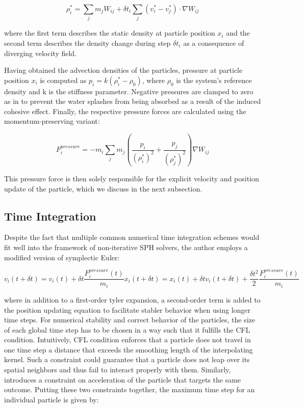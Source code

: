 \documentclass[
	11pt, 
	DIV10,
	ngerman,
	a4paper, 
	oneside, 
	headings=normal, 
	captions=tableheading,
	final, 
	numbers=noenddot
]{scrartcl}
\begin{document}
\begin{equation}
	\label{eq4}
	\rho_{i}^{*} = \sum_{j}m_{j}W_{ij} + \delta t_{i}\sum_{j}(v_{i}^{*} - v_{j}^{*})\cdot \nabla W_{ij}
\end{equation}

where the first term describes the static density at particle position $ x_{i} $ and the second term describes the density change during step $ \delta t_{i} $ as a consequence of diverging velocity field.
\par
Having obtained the advection densities of the particles, pressure at particle position $ x_{i} $ is computed as $ p_{i} = k(\rho_{i}^{*} - \rho_{0}) $, where $ \rho_{0} $ is the system's reference density and k is the stiffness parameter. Negative pressures are clamped to zero as in \cite{ihmsen2013implicit} to prevent the water splashes from being absorbed as a result of the induced cohesive effect. Finally, the respective pressure forces are calculated using the momentum-preserving variant:

\begin{equation}
	\label{eq5}
	F_{i}^{pressure} = -m_{i}\sum_{j}m_{j}(\frac{p_{i}}{(\rho_{i}^{*})^{2}} + \frac{p_{j}}{(\rho_{j}^{*})^{2}})\nabla W_{ij}
\end{equation}

This pressure force is then solely responsible for the explicit velocity and position update of the particle, which we discuss in the next subsection.

\subsection{Time Integration}

Despite the fact that multiple common numerical time integration schemes would fit well into the framework of non-iterative SPH solvers, the author employs a modified version of symplectic Euler:

\begin{equation}
	\label{eq6}
	v_{i}(t + \delta t) = v_{i}(t) + \delta	t\frac{F_{i}^{pressure}(t)}{m_{i}}
	x_{i}(t + \delta t) = x_{i}(t) + \delta t v_{i}(t + \delta t) + \frac{\delta t^{2}}{2}\frac{F_{i}^{pressure}(t)}{m_{i}}
\end{equation}

where in addition to a first-order tyler expansion, a second-order term is added to the position updating equation to facilitate stabler behavior when using longer time steps. For numerical stability and correct behavior of the particles, the size of each global time step has to be chosen in a way such that it fulfills the CFL condition. Intuitively, CFL condition enforces that a particle does not travel in one time step a distance that exceeds the smoothing length of the interpolating kernel. Such a constraint could guarantee that a particle does not leap over its spatial neighbors and thus fail to interact properly with them. Similarly, \cite{PE:vriphys:vriphys10:079-088} introduces a constraint on acceleration of the particle that targets the same outcome. Putting these two constraints together, the maximum time step for an individual particle is given by:
\end{document}
